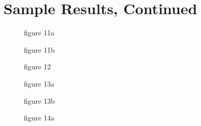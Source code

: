\chapter{Sample Results, Continued}




\setcounter{figure}{10}

\begin{figure}
\epsfxsize=5.6in  %
\epsfysize=7.0in  %
\caption{figure 11a}
\label{fig:11a}
\end{figure}


\newpage

\setcounter{figure}{10}

\begin{figure}
\epsfxsize=5.6in  %
\epsfysize=7.0in  %
\caption{figure 11b}
\label{fig:11b}
\end{figure}


\newpage

\setcounter{figure}{11}

\begin{figure}
\epsfxsize=5.6in  %
\epsfysize=7.0in  %
\caption{figure 12}
\label{fig:12}
\end{figure}


\newpage

\setcounter{figure}{12}

\begin{figure}
\epsfxsize=5.6in  %
\epsfysize=7.0in  %
\caption{figure 13a}
\label{fig:13a}
\end{figure}


\newpage

\setcounter{figure}{12}

\begin{figure}
\epsfxsize=5.6in  %
\epsfysize=7.0in  %
\caption{figure 13b}
\label{fig:13b}
\end{figure}

\newpage

\setcounter{figure}{13}

\begin{figure}
\epsfxsize=5.6in  %
\epsfysize=7.0in  %
\caption{figure 14a}
\label{fig:14a}
\end{figure}


